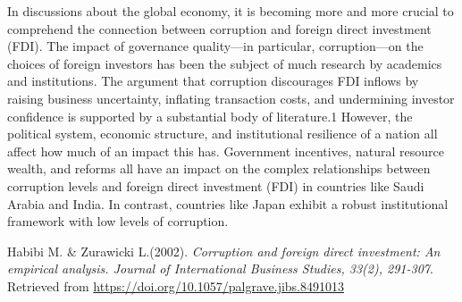 \documentclass{article}
\begin{document}
In discussions about the global economy, it is becoming more and more crucial to comprehend the connection between corruption and foreign direct investment (FDI). The impact of governance quality—in particular, corruption—on the choices of foreign investors has been the subject of much research by academics and institutions. The argument that corruption discourages FDI inflows by raising business uncertainty, inflating transaction costs, and undermining investor confidence is supported by a substantial body of literature.{1} However, the political system, economic structure, and institutional resilience of a nation all affect how much of an impact this has. Government incentives, natural resource wealth, and reforms all have an impact on the complex relationships between corruption levels and foreign direct investment (FDI) in countries like Saudi Arabia and India. In contrast, countries like Japan exhibit a robust institutional framework with low levels of corruption.


\begin{thebibliography}{99}

Habibi M. & Zurawicki L.(2002). \textit{Corruption and foreign direct investment: An empirical analysis. Journal of International Business Studies, 33(2), 291-307}.  
Retrieved from \url{https://doi.org/10.1057/palgrave.jibs.8491013}




\end{thebibliography}
\end{document}
